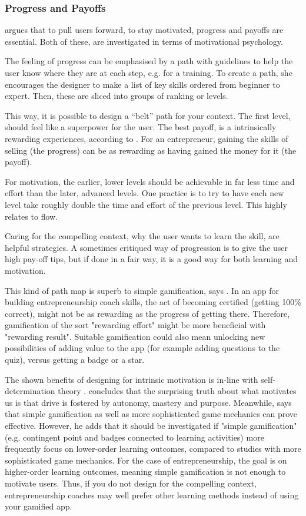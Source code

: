 \subsubsection{Progress and Payoffs} \label{progress-payoffs}

\cite{sierra} argues that to pull users forward, to stay motivated, progress and payoffs are essential. Both of these, are investigated in terms of motivational psychology.

The feeling of progress can be emphasised by a path with guidelines to help the user know where they are at each step, e.g. for a training. To create a path, she encourages the designer to make a list of key skills ordered from beginner to expert. Then, these are sliced into groups of ranking or levels.

This way, it is possible to design a “belt” path for your context. The first level, should feel like a superpower for the user. The best payoff, is a intrinsically rewarding experiences, according to \cite{sierra}. For an entrepreneur, gaining the skills of selling (the progress) can be as rewarding as having gained the money for it (the payoff).

For motivation, the earlier, lower levels should be achievable in far less time and effort than the later, advanced levels. One practice is to try to have each new level take roughly double the time and effort of the previous level. This highly relates to flow.

Caring for the compelling context, why the user wants to learn the skill, are helpful strategies. A sometimes critiqued way of progression is to give the user high pay-off tips, but if done in a fair way, it is a good way for both learning and motivation.

This kind of path map is superb to simple gamification, says \cite{sierra}. In an app for building entrepreneurship coach skills, the act of becoming certified (getting 100\% correct), might not be as rewarding as the progress of getting there. Therefore, gamification of the sort "rewarding effort" might be more beneficial with "rewarding result". Suitable gamification could also mean unlocking new possibilities of adding value to the app (for example adding questions to the quiz), versus getting a badge or a star.

The shown benefits of designing for intrinsic motivation is in-line with self-determination theory \citep{deci, ryan}.  \cite{pink} concludes that the surprising truth about what motivates us is that drive is fostered by autonomy, mastery and purpose. Meanwhile, \cite{gates} says that simple gamification as well as more sophisticated game mechanics can prove effective. However, he adds that it should be investigated if "simple gamification" (e.g. contingent point and badges connected to learning activities) more frequently focus on lower-order learning outcomes, compared to studies with more sophisticated game mechanics. For the case of entrepreneurship, the goal is on higher-order learning outcomes, meaning simple gamification is not enough to motivate users. Thus, if you do not design for the compelling context, entrepreneurship coaches may well prefer other learning methods instead of using your gamified app.
